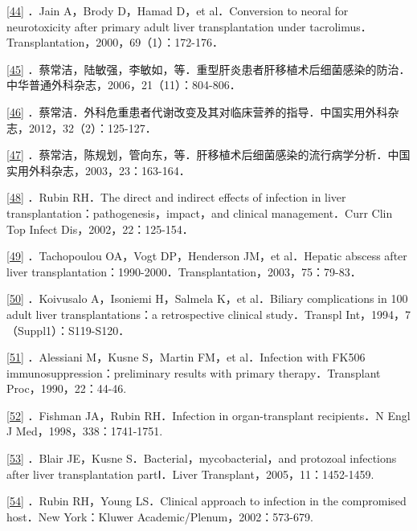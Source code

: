 \protect\hyperlink{text00020.htmlux5cux23ch44-19-back}{{[}44{]}} ．Jain
A，Brody D，Hamad D，et al．Conversion to neoral for neurotoxicity after
primary adult liver transplantation under
tacrolimus．Transplantation，2000，69（1）：172-176．

\protect\hyperlink{text00020.htmlux5cux23ch45-19-back}{{[}45{]}}
．蔡常洁，陆敏强，李敏如，等．重型肝炎患者肝移植术后细菌感染的防治．中华普通外科杂志，2006，21（11）：804-806．

\protect\hyperlink{text00020.htmlux5cux23ch46-19-back}{{[}46{]}}
．蔡常洁．外科危重患者代谢改变及其对临床营养的指导．中国实用外科杂志，2012，32（2）：125-127．

\protect\hyperlink{text00020.htmlux5cux23ch47-19-back}{{[}47{]}}
．蔡常洁，陈规划，管向东，等．肝移植术后细菌感染的流行病学分析．中国实用外科杂志，2003，23：163-164．

\protect\hyperlink{text00020.htmlux5cux23ch48-19-back}{{[}48{]}} ．Rubin
RH．The direct and indirect effects of infection in liver
transplantation：pathogenesis，impact，and clinical management．Curr
Clin Top Infect Dis，2002，22：125-154．

\protect\hyperlink{text00020.htmlux5cux23ch49-19-back}{{[}49{]}}
．Tachopoulou OA，Vogt DP，Henderson JM，et al．Hepatic abscess after
liver transplantation：1990-2000．Transplantation，2003，75：79-83．

\protect\hyperlink{text00020.htmlux5cux23ch50-19-back}{{[}50{]}}
．Koivusalo A，Isoniemi H，Salmela K，et al．Biliary complications in
100 adult liver transplantations：a retrospective clinical
study．Transpl Int，1994，7（Suppl1）：S119-S120．

\protect\hyperlink{text00020.htmlux5cux23ch51-19-back}{{[}51{]}}
．Alessiani M，Kusne S，Martin FM，et al．Infection with FK506
immunosuppression：preliminary results with primary therapy．Transplant
Proc，1990，22：44-46.

\protect\hyperlink{text00020.htmlux5cux23ch52-19-back}{{[}52{]}}
．Fishman JA，Rubin RH．Infection in organ-transplant recipients．N Engl
J Med，1998，338：1741-1751.

\protect\hyperlink{text00020.htmlux5cux23ch53-19-back}{{[}53{]}} ．Blair
JE，Kusne S．Bacterial，mycobacterial，and protozoal infections after
liver transplantation partⅠ．Liver Transplant，2005，11：1452-1459.

\protect\hyperlink{text00020.htmlux5cux23ch54-19-back}{{[}54{]}} ．Rubin
RH，Young LS．Clinical approach to infection in the compromised
host．New York：Kluwer Academic/Plenum，2002：573-679.

